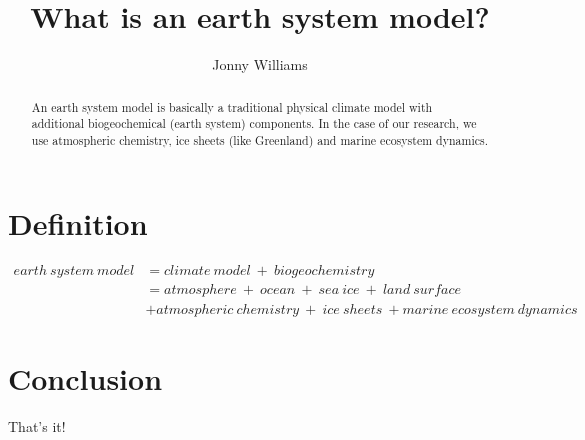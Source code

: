 \documentclass{article}
\begin{document}
\title{What is an earth system model?}
\author{Jonny Williams}

\maketitle

\begin{abstract}
An earth system model is basically a traditional physical climate model with additional biogeochemical (earth system) components. In the case of our research, we use atmospheric chemistry, ice sheets (like Greenland) and marine ecosystem dynamics.
\end{abstract}

\section{Definition}


\begin{equation}
\begin{split}
earth\ system\ model &= climate\ model\ +\ biogeochemistry \\
&= atmosphere\ +\ ocean\ +\ sea\ ice\ +\ land\ surface \\
&+ atmospheric\ chemistry\ +\ ice\ sheets\ + marine\ ecosystem\ dynamics 
\end{split}
\end{equation}


\section{Conclusion}
That's it!
\end{document}
